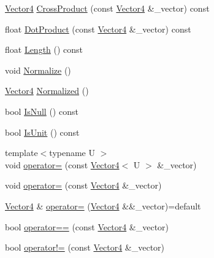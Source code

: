 \begin{DoxyCompactItemize}
\mbox{\hyperlink{structpad_1_1math_1_1_vector4}{Vector4}} \mbox{\hyperlink{structpad_1_1math_1_1_vector4_a46ae48163a69e577092edb42b67ae84d}{Cross\+Product}} (const \mbox{\hyperlink{structpad_1_1math_1_1_vector4}{Vector4}} \&\+\_\+vector) const
\item 
float \mbox{\hyperlink{structpad_1_1math_1_1_vector4_aa2bc23659e5331ea63c4135ff4ba0cc5}{Dot\+Product}} (const \mbox{\hyperlink{structpad_1_1math_1_1_vector4}{Vector4}} \&\+\_\+vector) const
\item 
float \mbox{\hyperlink{structpad_1_1math_1_1_vector4_ac374b52275efc5f8e8b988e347fc340e}{Length}} () const
\item 
void \mbox{\hyperlink{structpad_1_1math_1_1_vector4_ae79f5cf216a4270769bfb88a54d0541d}{Normalize}} ()
\item 
\mbox{\hyperlink{structpad_1_1math_1_1_vector4}{Vector4}} \mbox{\hyperlink{structpad_1_1math_1_1_vector4_a984da7891140213ff81038628beae587}{Normalized}} ()
\item 
bool \mbox{\hyperlink{structpad_1_1math_1_1_vector4_a60b73d235abc2a5948dccbe786de338f}{Is\+Null}} () const
\item 
bool \mbox{\hyperlink{structpad_1_1math_1_1_vector4_a194b228f5e0d3d8171daaa78927a7bd3}{Is\+Unit}} () const
\item 
{\footnotesize template$<$typename U $>$ }\\void \mbox{\hyperlink{structpad_1_1math_1_1_vector4_a4b379b87ccdaa94f49cb31c017fedd4f}{operator=}} (const \mbox{\hyperlink{structpad_1_1math_1_1_vector4}{Vector4}}$<$ U $>$ \&\+\_\+vector)
\item 
void \mbox{\hyperlink{structpad_1_1math_1_1_vector4_ac705833566aae9930fa13586833a535b}{operator=}} (const \mbox{\hyperlink{structpad_1_1math_1_1_vector4}{Vector4}} \&\+\_\+vector)
\item 
\mbox{\hyperlink{structpad_1_1math_1_1_vector4}{Vector4}} \& \mbox{\hyperlink{structpad_1_1math_1_1_vector4_aa8541807bf5c8c3a0b5edb851feb858a}{operator=}} (\mbox{\hyperlink{structpad_1_1math_1_1_vector4}{Vector4}} \&\&\+\_\+vector)=default
\item 
bool \mbox{\hyperlink{structpad_1_1math_1_1_vector4_afe872f9553149f12674806bb6e7eb786}{operator==}} (const \mbox{\hyperlink{structpad_1_1math_1_1_vector4}{Vector4}} \&\+\_\+vector)
\item 
bool \mbox{\hyperlink{structpad_1_1math_1_1_vector4_ad8e026dad9a90b1f38211054b16ff68f}{operator!=}} (const \mbox{\hyperlink{structpad_1_1math_1_1_vector4}{Vector4}} \&\+\_\+vector)
\item 

\end{DoxyCompactItemize}
